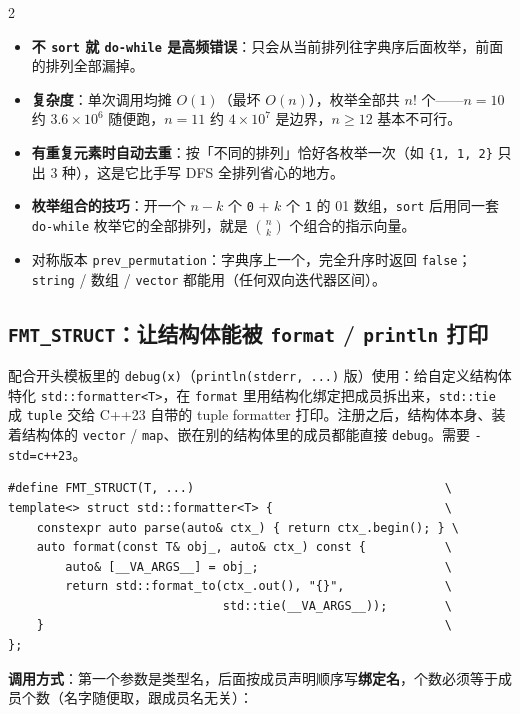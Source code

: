 \begin{multicols*}{2}
		\begin{itemize}
			\item \textbf{不 \texttt{sort} 就 \texttt{do-while} 是高频错误}：只会从当前排列往字典序后面枚举，前面的排列全部漏掉。
			\item \textbf{复杂度}：单次调用均摊 $O(1)$（最坏 $O(n)$），枚举全部共 $n!$ 个——$n = 10$ 约 $3.6 \times 10^6$ 随便跑，$n = 11$ 约 $4 \times 10^7$ 是边界，$n \ge 12$ 基本不可行。
			\item \textbf{有重复元素时自动去重}：按「不同的排列」恰好各枚举一次（如 \texttt{\{1, 1, 2\}} 只出 3 种），这是它比手写 DFS 全排列省心的地方。
			\item \textbf{枚举组合的技巧}：开一个 $n - k$ 个 \texttt{0} + $k$ 个 \texttt{1} 的 01 数组，\texttt{sort} 后用同一套 \texttt{do-while} 枚举它的全部排列，就是 $\binom{n}{k}$ 个组合的指示向量。
			\item 对称版本 \texttt{prev\_permutation}：字典序上一个，完全升序时返回 \texttt{false}；\texttt{string} / 数组 / \texttt{vector} 都能用（任何双向迭代器区间）。
		\end{itemize}
		\subsection[\tochl{\texttt{FMT\_STRUCT}：让结构体能被 \texttt{format} / \texttt{println} 打印}]{\texttt{FMT\_STRUCT}：让结构体能被 \texttt{format} / \texttt{println} 打印}

		配合开头模板里的 \texttt{debug(x)}（\texttt{println(stderr, ...)} 版）使用：给自定义结构体特化 \texttt{std::formatter<T>}，在 \texttt{format} 里用结构化绑定把成员拆出来，\texttt{std::tie} 成 \texttt{tuple} 交给 C++23 自带的 tuple formatter 打印。注册之后，结构体本身、装着结构体的 \texttt{vector} / \texttt{map}、嵌在别的结构体里的成员都能直接 \texttt{debug}。需要 \texttt{-std=c++23}。

		\begin{verbatim}
#define FMT_STRUCT(T, ...)                                   \
template<> struct std::formatter<T> {                        \
    constexpr auto parse(auto& ctx_) { return ctx_.begin(); } \
    auto format(const T& obj_, auto& ctx_) const {           \
        auto& [__VA_ARGS__] = obj_;                          \
        return std::format_to(ctx_.out(), "{}",              \
                              std::tie(__VA_ARGS__));        \
    }                                                        \
};
		\end{verbatim}

		\textbf{调用方式}：第一个参数是类型名，后面按成员声明顺序写\textbf{绑定名}，个数必须等于成员个数（名字随便取，跟成员名无关）：


\end{multicols*}
